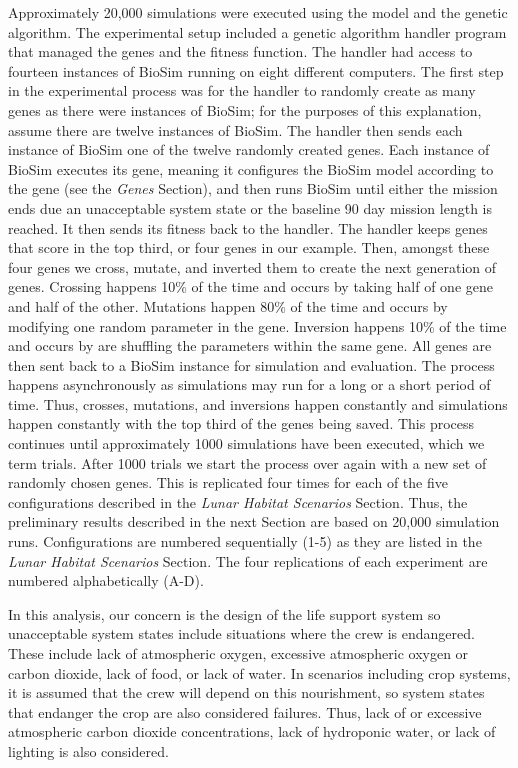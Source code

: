 \documentclass[submit]{aiaa}
\begin{document}
Approximately 20,000 simulations were executed using the model and the genetic algorithm.  
The experimental setup included a genetic
algorithm handler program that managed the genes and the fitness
function.  The handler had access to fourteen instances of BioSim
running on eight different computers.  
The first step in the experimental process was for the handler to randomly create as many genes as there were instances of BioSim; for the purposes of this explanation, assume there are twelve instances of BioSim.  
The handler then sends each instance of BioSim one of the twelve randomly created genes.  
Each instance of BioSim executes its gene, meaning it configures the BioSim model according to the gene (see the \emph{Genes} Section),
and then runs BioSim until either the mission ends due an unacceptable system state or the baseline 90 day mission length is reached.
It then sends its fitness back to the handler.
The handler keeps genes that score in the top third, or four genes in our example.  
Then, amongst these four genes we cross, mutate, and  inverted them to create the next generation of genes.
Crossing happens 10\% of the time and occurs by taking half of one gene and half of the other.  
Mutations happen 80\% of the time and occurs by modifying one random parameter in the gene.  
Inversion happens 10\% of the time and occurs by are shuffling the parameters within the same gene.  
All genes are then sent back to a BioSim instance for
simulation and evaluation.  The process happens asynchronously as
simulations may run for a long or a short period of time.  
Thus, crosses, mutations, and inversions happen constantly and simulations happen constantly with the top third of the genes being saved.  
This process continues until approximately 1000 simulations have been executed, which we term trials.  
After 1000 trials we start the process over again with a new set of randomly chosen genes.  
This is replicated four times for each of the five configurations described in
the \emph{Lunar Habitat Scenarios} Section.
Thus, the preliminary results described
in the next Section are based on 20,000 simulation
runs. Configurations are numbered sequentially (1-5) as they are
listed in the \emph{Lunar Habitat Scenarios} Section.
The four replications of each
experiment are numbered alphabetically (A-D).

In this analysis, our concern is the design of the life support system so unacceptable system states include situations where the crew is endangered.
These include lack of atmospheric oxygen, excessive atmospheric oxygen or carbon dioxide, lack of food, or lack of water.
In scenarios including crop systems, it is assumed that the crew will depend on this nourishment, so system states that endanger the crop are also considered failures.
Thus, lack of or excessive atmospheric carbon dioxide concentrations, lack of hydroponic water, or lack of lighting is also considered.
\end{document}
